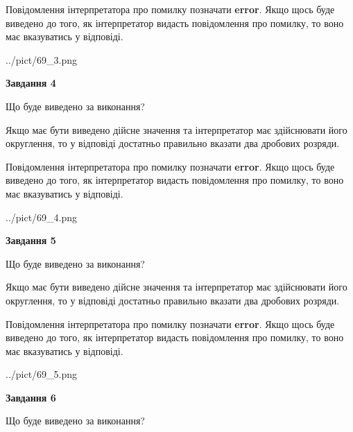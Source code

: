 \documentclass[12pt, ukrainian]{article}
\begin{document}
{\begin {Large}
Повідомлення інтерпретатора про помилку позначати \textbf{error}.
Якщо щось буде виведено до того, як інтерпретатор видасть повідомлення про помилку, 
то воно має вказуватись у відповіді. \par

\begin{center}
	{../pict/69_3.png}
\end{center}
\newpage

{\begin {center}\textbf{Завдання 4}\end {center}}\par
Що буде виведено за виконання? \par

Якщо має бути виведено дійсне значення та інтерпретатор має здійснювати його округлення, 
то у відповіді достатньо правильно вказати два дробових розряди.

Повідомлення інтерпретатора про помилку позначати \textbf{error}.
Якщо щось буде виведено до того, як інтерпретатор видасть повідомлення про помилку, 
то воно має вказуватись у відповіді. \par

\begin{center}
	{../pict/69_4.png}
\end{center}
\newpage

{\begin {center}\textbf{Завдання 5}\end {center}}\par
Що буде виведено за виконання? \par

Якщо має бути виведено дійсне значення та інтерпретатор має здійснювати його округлення, 
то у відповіді достатньо правильно вказати два дробових розряди.

Повідомлення інтерпретатора про помилку позначати \textbf{error}.
Якщо щось буде виведено до того, як інтерпретатор видасть повідомлення про помилку, 
то воно має вказуватись у відповіді. \par

\begin{center}
	{../pict/69_5.png}
\end{center}
\newpage

{\begin {center}\textbf{Завдання 6}\end {center}}\par
Що буде виведено за виконання? \par


\end{Large}}
\end{document}
